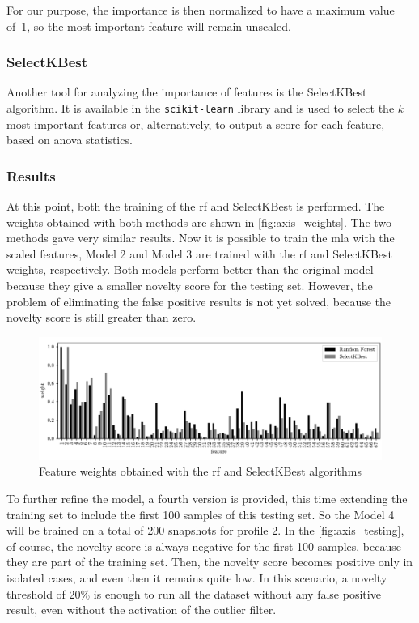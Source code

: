 For our purpose, the importance is then normalized to have a maximum value of~1, so the most important feature will remain unscaled.

\subsubsection{SelectKBest}
Another tool for analyzing the importance of features is the SelectKBest algorithm. It is available in the \texttt{scikit-learn} library and is used to select the $k$ most important features or, alternatively, to output a score for each feature, based on \gls{anova} statistics.

\subsubsection{Results}
At this point, both the training of the \gls{rf} and SelectKBest is performed. The weights obtained with both methods are shown in \autoref{fig:axis_weights}. The two methods gave very similar results. Now it is possible to train the \gls{mla} with the scaled features, Model 2 and Model 3 are trained with the \gls{rf} and SelectKBest weights, respectively. Both models perform better than the original model because they give a smaller novelty score for the testing set. However, the problem of eliminating the false positive results is not yet solved, because the novelty score is still greater than zero.

\begin{figure}
    \centering
    \includegraphics[width=\textwidth]{images/LinearMotor/Feat_weights.pdf}
    \caption{Feature weights obtained with the \gls{rf} and SelectKBest algorithms}
    \label{fig:axis_weights}
\end{figure}

To further refine the model, a fourth version is provided, this time extending the training set to include the first 100 samples of this testing set. So the Model 4 will be trained on a total of 200 snapshots for profile 2. In the \autoref{fig:axis_testing}, of course, the novelty score is always negative for the first 100 samples, because they are part of the training set. Then, the novelty score becomes positive only in isolated cases, and even then it remains quite low. In this scenario, a novelty threshold of 20\% is enough to run all the dataset without any false positive result, even without the activation of the outlier filter.

